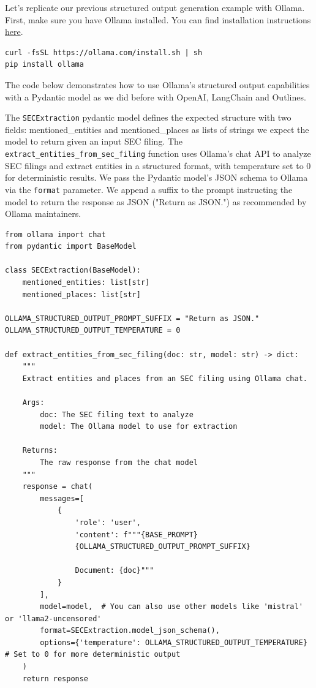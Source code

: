 Let's replicate our previous structured output generation example with Ollama. First, make sure you have Ollama installed. You can find installation instructions \href{https://ollama.com/docs/installation}{here}.

\begin{verbatim}
curl -fsSL https://ollama.com/install.sh | sh
pip install ollama
\end{verbatim}

The code below demonstrates how to use Ollama's structured output capabilities with a Pydantic model as we did before with OpenAI, LangChain and Outlines. 

The \texttt{SECExtraction} pydantic model defines the expected structure with two fields: mentioned\_entities and mentioned\_places as lists of strings we expect the model to return given an input SEC filing. The \texttt{extract\_entities\_from\_sec\_filing} function uses Ollama's chat API to analyze SEC filings and extract entities in a structured format, with temperature set to 0 for deterministic results. We pass the Pydantic model's JSON schema to Ollama via the \texttt{format} parameter. We append a suffix to the prompt instructing the model to return the response as JSON ("Return as JSON.") as recommended by Ollama maintainers.

\begin{verbatim}
from ollama import chat
from pydantic import BaseModel

class SECExtraction(BaseModel):
    mentioned_entities: list[str]
    mentioned_places: list[str]

OLLAMA_STRUCTURED_OUTPUT_PROMPT_SUFFIX = "Return as JSON."
OLLAMA_STRUCTURED_OUTPUT_TEMPERATURE = 0

def extract_entities_from_sec_filing(doc: str, model: str) -> dict:
    """
    Extract entities and places from an SEC filing using Ollama chat.
    
    Args:
        doc: The SEC filing text to analyze
        model: The Ollama model to use for extraction
        
    Returns:
        The raw response from the chat model
    """
    response = chat(
        messages=[
            {
                'role': 'user',
                'content': f"""{BASE_PROMPT}
                {OLLAMA_STRUCTURED_OUTPUT_PROMPT_SUFFIX}
                
                Document: {doc}"""
            }
        ],
        model=model,  # You can also use other models like 'mistral' or 'llama2-uncensored'
        format=SECExtraction.model_json_schema(),
        options={'temperature': OLLAMA_STRUCTURED_OUTPUT_TEMPERATURE}  # Set to 0 for more deterministic output
    )
    return response
\end{verbatim}

